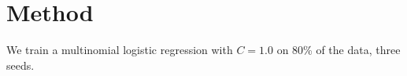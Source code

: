 \section{Method}
We train a multinomial logistic regression with $C=1.0$ on 80\% of the data, three seeds.
